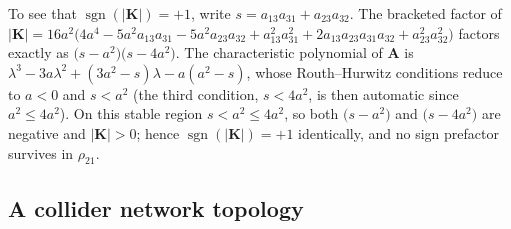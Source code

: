 \documentclass{article}
\begin{document}
To see that $\operatorname{sgn}(|\mathbf{K}|)=+1$, write $s=a_{13}a_{31}+a_{23}a_{32}$. The
bracketed factor of
$|\mathbf{K}|=16a^2\bigl(4a^4-5a^2a_{13}a_{31}-5a^2a_{23}a_{32}+a_{13}^2a_{31}^2+2a_{13}a_{23}a_{31}a_{32}+a_{23}^2a_{32}^2\bigr)$
factors exactly as $\bigl(s-a^2\bigr)\bigl(s-4a^2\bigr)$. The characteristic polynomial of
$\mathbf{A}$ is $\lambda^3-3a\lambda^2+(3a^2-s)\lambda-a(a^2-s)$, whose Routh--Hurwitz conditions
reduce to $a<0$ and $s<a^2$ (the third condition, $s<4a^2$, is then automatic since
$a^2\le4a^2$). On this stable region $s<a^2\le4a^2$, so both $\bigl(s-a^2\bigr)$ and
$\bigl(s-4a^2\bigr)$ are negative and $|\mathbf{K}|>0$; hence $\operatorname{sgn}(|\mathbf{K}|)=+1$
identically, and no sign prefactor survives in $\rho_{21}$.

\subsection*{A collider network topology}
\end{document}
